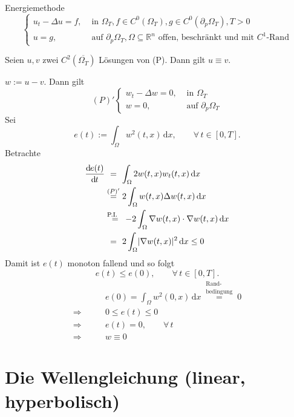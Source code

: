 Energiemethode 
\[
	\begin{cases}
		u_t - \Delta u = f, &\text{ in }\Omega_T, f \in C^0(\Omega_T), g \in C^0(\partial_p \Omega_T), T >0\\
		u = g ,&\text{ auf } \partial_p \Omega_T, \Omega \subseteq \mathbb{R}^n \text{ offen, beschränkt und mit $C^1$-Rand}
	\end{cases}
\]
\begin{satz}
	Seien $u,v$ zwei $C^2(\overline{\Omega_T})$ Lösungen von (P). Dann gilt $u \equiv v$.
\end{satz}
\begin{beweis}
	$w:= u -v$. Dann gilt 
	\[
		(P)'\begin{cases}
			w_t -\Delta w = 0, &\text{ in }\Omega_T\\
			w = 0, &\text{ auf } \partial_p \Omega_T
		\end{cases}
	\]
	Sei
	\[
		e(t):= \int_{\Omega}^{} w^2(t,x) \,\mathrm{d}x, \qquad \forall\, t \in [0,T].
	\]
	Betrachte
	\begin{align*}
		\frac{\mathrm{d}\mkern-1.0mu e(t)}{\mathrm{d}\mkern-1.0mu t}  & \stackrel{\hphantom{(P)'}}{=} \int_{\Omega}^{} 2 w(t,x) w_t(t,x) \,\mathrm{d}x  \\
		&\stackrel{(P)'}{=} 2 \int_{\Omega}^{} w(t,x) \Delta w(t,x) \,\mathrm{d}x \\
		&\stackrel{\text{P.I.\hphantom{...}}}{=} -2 \int_{\Omega}^{}  \nabla  w(t,x) \cdot  \nabla w(t,x) \,\mathrm{d}x \\
		&\stackrel{\hphantom{(P)'}}{=} 2 \int_{\Omega}^{} \lvert \nabla w(t,x)\rvert^2 \,\mathrm{d}x \leq 0
	\end{align*}
	Damit ist $e(t)$ monoton fallend und so folgt
	\[
		e(t) \leq e(0), \qquad \forall\, t \in [0,T].
	\]
	\begin{align*}
		& \qquad e(0) = \int_{\Omega}^{} w^2(0,x) \,\mathrm{d}x \stackrel{\substack{\text{Rand-}\\\text{bedingung}}}{=} 0 \\
		\Rightarrow& \qquad 0 \leq e(t) \leq 0 \\
		\Rightarrow & \qquad  e(t) = 0, \qquad \forall\, t \\
		\Rightarrow & \qquad  w \equiv 0  
	\end{align*}
\end{beweis}
\newpage
\section{Die Wellengleichung (linear, hyperbolisch)} 
\label{sec:die_wellengleichung_linear_hyperbolisch}

